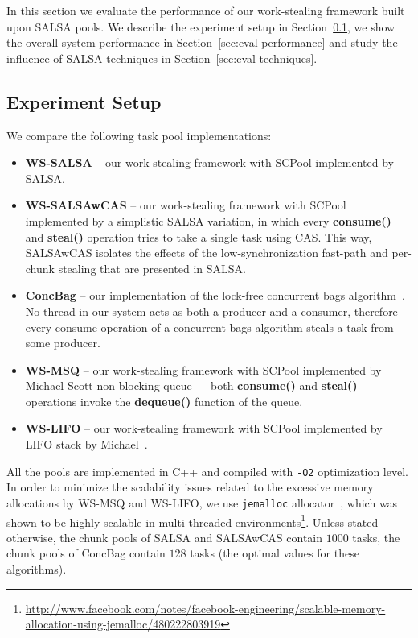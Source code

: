 In this section we evaluate the performance of our work-stealing framework built upon SALSA pools. 
We describe the experiment setup in Section~\ref{sec:exp-setup}, we show the overall system performance in Section~\ref{sec:eval-performance} and study the influence of SALSA techniques in Section~\ref{sec:eval-techniques}.

\subsection {Experiment Setup}
\label{sec:exp-setup}
We compare the following task pool implementations: 
\begin {itemize}
\item
{\bf WS-SALSA} -- our work-stealing framework with SCPool implemented by SALSA.
\item
{\bf WS-SALSAwCAS} -- our work-stealing framework with SCPool implemented by a simplistic SALSA variation, in which every {\bf consume()} and {\bf steal()} operation tries to take a single task using CAS. This way, SALSAwCAS isolates the effects of the low-synchronization fast-path and per-chunk stealing that are presented in SALSA.  
\item
{\bf ConcBag} -- our implementation of the lock-free concurrent bags algorithm~\cite{Sundell:2011:LAC:1989493.1989550}. 
No thread in our system acts as both a producer and a consumer, therefore every consume operation of a concurrent bags algorithm steals a task from some producer.
\item
{\bf WS-MSQ} -- our work-stealing framework with SCPool implemented by Michael-Scott non-blocking queue~\cite{Michael:1996:SFP:248052.248106} -- both {\bf consume()} and {\bf steal()} operations invoke the {\bf dequeue()} function of the queue. 
\item
{\bf WS-LIFO} -- our work-stealing framework with SCPool implemented by LIFO stack by Michael~\cite{Michael:2004:HPS:987524.987595}. 
\end {itemize} 

All the pools are implemented in C++ and compiled with \texttt{-O2} optimization level. 
In order to minimize the scalability issues related to the excessive memory allocations by WS-MSQ and WS-LIFO, we use \texttt{jemalloc} allocator~\cite{citeulike:4951109}, which was shown to be highly scalable in multi-threaded environments\footnote{\url{http://www.facebook.com/notes/facebook-engineering/scalable-memory-allocation-using-jemalloc/480222803919}}.
Unless stated otherwise, the chunk pools of SALSA and SALSAwCAS contain $1000$ tasks, the chunk pools of ConcBag contain $128$ tasks (the optimal values for these algorithms). 

